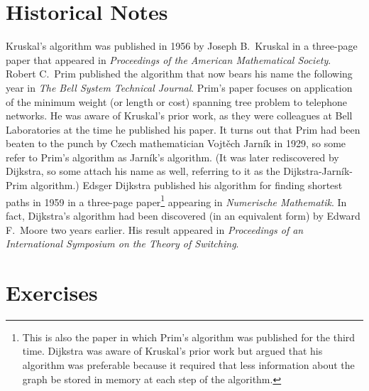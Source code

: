 \section{Historical Notes}

Kruskal's algorithm was published in 1956 by Joseph B.\ Kruskal in a
three-page paper that appeared in \emph{Proceedings of the American
  Mathematical Society}. Robert C.\ Prim published the algorithm that
now bears his name the following year in \emph{The Bell System
  Technical Journal}. Prim's paper focuses on application of the
minimum weight (or length or cost) spanning tree problem to telephone
networks. He was aware of Kruskal's prior work, as they were
colleagues at Bell Laboratories at the time he published his paper. It
turns out that Prim had been beaten to the punch by Czech
mathematician Vojt\v{e}ch Jarn\'{i}k in 1929, so some refer to Prim's
algorithm as Jarn\'{i}k's algorithm. (It was later rediscovered by
Dijkstra, so some attach his name as well, referring to it as the
Dijkstra-Jarn\'{i}k-Prim algorithm.) Edsger Dijkstra published his
algorithm for finding shortest paths in 1959 in a three-page
paper\footnote{This is also the paper in which Prim's algorithm was
  published for the third time. Dijkstra was aware of Kruskal's prior
  work but argued that his algorithm was preferable because it
  required that less information about the graph be stored in memory
  at each step of the algorithm.}  appearing in \emph{Numerische
  Mathematik}. In fact, Dijkstra's algorithm had been discovered (in
an equivalent form) by Edward F.\ Moore two years earlier. His result
appeared in \emph{Proceedings of an International Symposium on the
  Theory of Switching}.

\section{Exercises}

